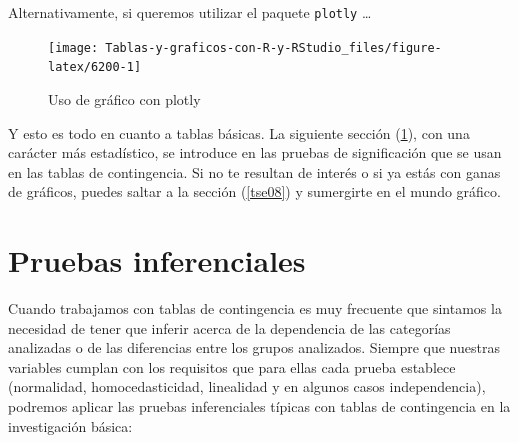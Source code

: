 \documentclass[
]{book}
\newenvironment{Shaded}{\begin{snugshade}}{\end{snugshade}}
\newcommand{\AttributeTok}[1]{\textcolor[rgb]{0.77,0.63,0.00}{#1}}
\newcommand{\FunctionTok}[1]{\textcolor[rgb]{0.00,0.00,0.00}{#1}}
\newcommand{\NormalTok}[1]{#1}
\newcommand{\OtherTok}[1]{\textcolor[rgb]{0.56,0.35,0.01}{#1}}
\newcommand{\SpecialCharTok}[1]{\textcolor[rgb]{0.00,0.00,0.00}{#1}}
\newcommand{\StringTok}[1]{\textcolor[rgb]{0.31,0.60,0.02}{#1}}
\begin{document}
Alternativamente, si queremos utilizar el paquete \texttt{plotly} \ldots{}

\begin{Shaded}
\end{Shaded}

\begin{figure}[H]

{\centering \texttt{[image: Tablas-y-graficos-con-R-y-RStudio\_files/figure-latex/6200-1]} 

}

\caption{Uso de gráfico con plotly}\label{fig:6200}
\end{figure}

Y esto es todo en cuanto a tablas básicas. La siguiente sección (\ref{tse07}), con una carácter más estadístico, se introduce en las pruebas de significación que se usan en las tablas de contingencia. Si no te resultan de interés o si ya estás con ganas de gráficos, puedes saltar a la sección (\ref{tse08}) y sumergirte en el mundo gráfico.

\hypertarget{tse07}{%
\chapter{Pruebas inferenciales}\label{tse07}}

Cuando trabajamos con tablas de contingencia es muy frecuente que sintamos la necesidad de tener que inferir acerca de la dependencia de las categorías analizadas o de las diferencias entre los grupos analizados. Siempre que nuestras variables cumplan con los requisitos que para ellas cada prueba establece (normalidad, homocedasticidad, linealidad y en algunos casos independencia), podremos aplicar las pruebas inferenciales típicas con tablas de contingencia en la investigación básica:
\end{document}
